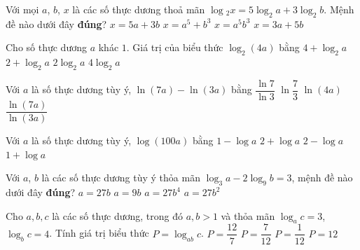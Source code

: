 \begin{ex}%
	[Mã 104 2017] Với mọi $a$, $b$, $x$ là các số thực  dương thoả mãn \break $\log{_2}x=5\log_2a+3\log_2b$. Mệnh đề nào dưới đây \textbf{đúng}?
	 \choice
		 {$x=5a+3b$}
		 {$x=a^5+b^3$}
		{\True  $x=a^5b^3$}
		{$x=3a+5b$} 
\end{ex}

\begin{ex}%
	Cho số thực  dương $a$ khác $1$. Giá trị của biểu thức $\log_2(4a)$ bằng
	 \choice
		 {$4+\log_2a$}
		{\True  $2+\log_2a$}
		 {$2\log_2a$}
		{$4\log_2a$} 
\end{ex}

\begin{ex}%
	[Mã 103 2018]  Với $a$ là số thực dương tùy ý, $\ln (7a)-\ln (3a)$ bằng
	\choice 
		{$\dfrac{\ln 7}{\ln  3}$}
		{\True  $\ln \dfrac{7}{3}$}
		{$\ln (4a)$} 
		{$\dfrac{\ln (7a)}{\ln  (3a)}$}
\end{ex}

\begin{ex}%
	Với $a$  là số thực dương tùy ý, $\log (100a)$ bằng
	 \choice
		{$1-\log  a$}
		{\True  $2+\log a$}
		{$2-\log a$} 
		{$1+\log  a$}
\end{ex}

\begin{ex}%
	[Mã 103 - 2020 Lần 2] Với $a$, $b$ là các số thực  dương tùy ý thỏa mãn $\log_3a-2\log_9b=3$, mệnh đề nào dưới đây \textbf{đúng}?
	\choice 
		 {\True $a=27b$}
		{$a=9b$} 
		 {$a=27b^4$}
		{$a=27b^2$} 
\end{ex}

\begin{ex}%
	Cho $a,b,c$ là các số thực dương, trong đó $a,b >  1$ và thỏa mãn $\log_{a}c=3$, $\log_{b}c=4$. Tính giá trị biểu thức $P=\log_{ab}c$.
	\choice 
		{\True  $P=\dfrac{12}{7}$}
		 {$P=\dfrac{7}{12}$}
		{$P=\dfrac{1}{12}$} 
		 {$P=12$}
\end{ex}

